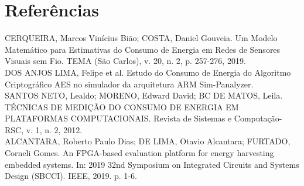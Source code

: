 \chapter{Referências}
CERQUEIRA, Marcos Vinícius Bião; COSTA, Daniel Gouveia. Um Modelo Matemático para Estimativas do Consumo de Energia em Redes de Sensores Visuais sem Fio. TEMA (São Carlos), v. 20, n. 2, p. 257-276, 2019.\\

DOS ANJOS LIMA, Felipe et al. Estudo do Consumo de Energia do Algoritmo Criptográfico AES no simulador da arquitetura ARM Sim-Panalyzer.\\

SANTOS NETO, Lealdo; MORENO, Edward David; BC DE MATOS, Leila. TÉCNICAS DE MEDIÇÃO DO CONSUMO DE ENERGIA EM PLATAFORMAS COMPUTACIONAIS. Revista de Sistemas e Computação-RSC, v. 1, n. 2, 2012.\\

ALCANTARA, Roberto Paulo Dias; DE LIMA, Otavio Alcantara; FURTADO, Corneli Gomes. An FPGA-based evaluation platform for energy harvesting embedded systems. In: 2019 32nd Symposium on Integrated Circuits and Systems Design (SBCCI). IEEE, 2019. p. 1-6.\\
